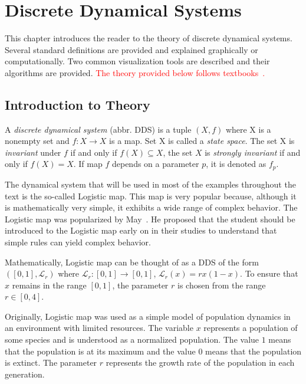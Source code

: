 \chapter{Discrete Dynamical Systems}

This chapter introduces the reader to the theory of discrete dynamical systems.
Several standard definitions are provided and explained graphically or computationally.
Two common visualization tools are described and their algorithms are provided.
\textcolor{red}{The theory provided below follows textbooks~\cite{Devaney20211026,Strogatz201854,Brin20100706}.}

\section{Introduction to Theory}

\begin{definition}
    A \emph{discrete dynamical system} (abbr. DDS) is a tuple $\left( X, f \right)$ where X is a nonempty set and $f: X \rightarrow X$ is a map.
    Set X is called a \emph{state space}.
    The set X is \emph{invariant} under $f$ if and only if $f(X) \subseteq X$, the set $X$ is \emph{strongly invariant} if and only if $f(X) = X$.
    If map $f$ depends on a parameter $p$, it is denoted as $f_p$.
\end{definition}

\begin{remark}
    The dynamical system that will be used in most of the examples throughout the text is the so-called Logistic map.
    This map is very popular because, although it is mathematically very simple, it exhibits a wide range of complex behavior.
    The Logistic map was popularized by May~\cite{May19760610}.
    He proposed that the student should be introduced to the Logistic map early on in their studies to understand that simple rules can yield complex behavior.
    \par
    Mathematically, Logistic map can be thought of as a DDS of the form $\left( [0, 1], \mathcal{L}_{r} \right)$ where $\mathcal{L}_{r}: [0,1] \rightarrow [0,1]$, $\mathcal{L}_{r}(x) = rx(1-x)$.
    To ensure that $x$ remains in the range $[0,1]$, the parameter $r$ is chosen from the range $r \in [0, 4]$.
    \par
    Originally, Logistic map was used as a simple model of population dynamics in an environment with limited resources.
    The variable $x$ represents a population of some species and is understood as a normalized population.
    The value $1$ means that the population is at its maximum and the value $0$ means that the population is extinct.
    The parameter $r$ represents the growth rate of the population in each generation. \cite{Strogatz201854}
\end{remark}

